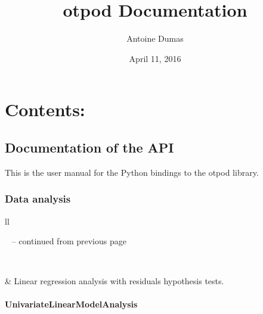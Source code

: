 \documentclass[letterpaper,10pt,english]{sphinxmanual}
\title{otpod Documentation}
\date{April 11, 2016}
\author{Antoine Dumas}
\begin{document}
\maketitle
\tableofcontents
{}\label{index::doc}



\chapter{Contents:}
\label{index:welcome-to-otpod-s-documentation}\label{index:contents}

\section{Documentation of the API}
\label{user_manual::doc}\label{user_manual:documentation-of-the-api}
This is the user manual for the Python bindings to the otpod library.


\subsection{Data analysis}
\label{user_manual:data-analysis}
\begin{longtable}{ll}
\hline
\endfirsthead

%
{{\textsf{\tablename\ \thetable{} -- continued from previous page}}} \\
\hline
\endhead

\hline {} \\ \hline
\endfoot

\endlastfoot


{\hyperref[_generated/otpod.UnivariateLinearModelAnalysis:otpod.UnivariateLinearModelAnalysis]{\emph{}}}
 & 
Linear regression analysis with residuals hypothesis tests.
\\
\hline\end{longtable}



\subsubsection{UnivariateLinearModelAnalysis}
\label{_generated/otpod.UnivariateLinearModelAnalysis:univariatelinearmodelanalysis}\label{_generated/otpod.UnivariateLinearModelAnalysis::doc}
\end{document}
